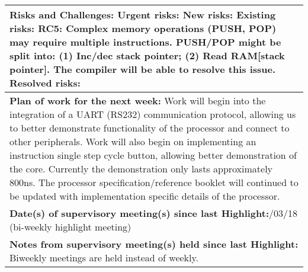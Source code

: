 \begin{table}[H]
\begin{tabularx}{\textwidth}{|X|}
	\\ \hline
	\textbf{Risks and Challenges:}\newline
	{\color{red} Urgent risks:}\newline
	{\color{orange} New risks:}\newline
	{\color{purple} Existing risks:\newline
	RC5: Complex memory operations (PUSH, POP) may require multiple instructions. PUSH/POP might be split into: (1) Inc/dec stack pointer; (2) Read RAM[stack pointer]. The compiler will be able to resolve this issue.}\newline
	{\color{gray} Resolved risks:}
	\\ \hline
	\textbf{Plan of work for the next week:}\newline
	Work will begin into the integration of a UART (RS232) communication protocol, allowing us to better demonstrate functionality of the processor and connect to other peripherals.
	\newline
	Work will also begin on implementing an instruction single step cycle button, allowing better demonstration of the core. Currently the demonstration only lasts approximately 800ns. 
	\newline
	The processor specification/reference booklet will continued to be updated with implementation specific details of the processor.
	\\ \hline
	\textbf{Date(s) of supervisory meeting(s) since last Highlight:}\newline
	01/03/18 (bi-weekly highlight meeting)
	\\ \hline
	\textbf{Notes from supervisory meeting(s) held since last Highlight:}\newline
	Biweekly meetings are held instead of weekly.
	\\ \hline
    \end{tabularx}
\end{table}


\newpage

